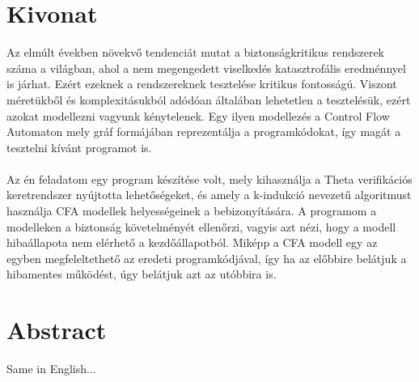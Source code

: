 \setcounter{page}{1}

\selecthungarian

\chapter*{Kivonat}

Az elmúlt években növekvő tendenciát mutat a biztonságkritikus rendszerek száma a világban, ahol a nem megengedett viselkedés katasztrofális eredménnyel is járhat. Ezért ezeknek a rendszereknek tesztelése kritikus fontosságú. Viszont méretükből és komplexitásukból adódóan általában lehetetlen a tesztelésük, ezért azokat modellezni vagyunk kénytelenek. Egy ilyen modellezés a Control Flow Automaton mely gráf formájában reprezentálja a programkódokat, így magát a tesztelni kívánt programot is.
\\
\\
Az én feladatom egy program készítése volt, mely kihasználja a Theta verifikációs keretrendszer nyújtotta lehetőségeket, és amely a k-indukció nevezetű algoritmust használja CFA modellek helyességeinek a bebizonyítására. A programom a modelleken a biztonság követelményét ellenőrzi, vagyis azt nézi, hogy a modell hibaállapota nem elérhető a kezdőállapotból. Miképp a CFA modell egy az egyben megfeleltethető az eredeti programkódjával, így ha az előbbire belátjuk a hibamentes működést, úgy belátjuk azt az utóbbira is.

\vfill
\selectenglish


\chapter*{Abstract}

Same in English...


\vfill
\cleardoublepage

\selectthesislanguage

\setcounter{romanPage}{\value{page}}
